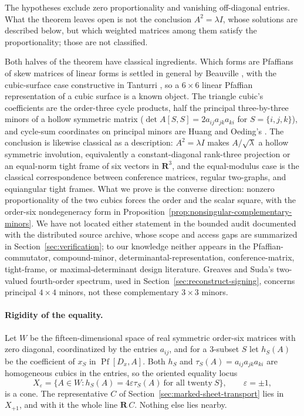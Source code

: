 The hypotheses exclude zero proportionality and vanishing off-diagonal entries.
What the theorem leaves open is not the conclusion \(A^2=\lambda I\), whose
solutions are described below, but which weighted matrices among them satisfy
the proportionality; those are not classified.

Both halves of the theorem have classical ingredients.  Which forms are
Pfaffians of skew matrices of linear forms is settled in general by Beauville
\cite{BeauvilleDeterminantal}, with the cubic-surface case constructive in
Tanturri \cite{TanturriPfaffian}, so a \(6\times6\) linear Pfaffian
representation of a cubic surface is a known object.  The triangle cubic's
coefficients are the order-three cycle products, half the principal
three-by-three minors of a hollow symmetric matrix
(\(\det A[S,S]=2a_{ij}a_{jk}a_{ki}\) for \(S=\{i,j,k\}\)), and cycle-sum
coordinates on principal minors are Huang and Oeding's \cite{HuangOeding}.
The conclusion is likewise classical as a description: \(A^2=\lambda I\)
makes \(A/\sqrt\lambda\) a hollow symmetric involution, equivalently a
constant-diagonal rank-three projection or an equal-norm tight frame of six
vectors in \(\mathbf R^3\), and the equal-modulus case is the classical
correspondence between conference matrices, regular two-graphs, and
equiangular tight frames.  What we prove is the converse direction: nonzero
proportionality of the two cubics forces the order and the scalar square,
with the order-six nondegeneracy form in
Proposition~\ref{prop:nonsingular-complementary-minors}.  We have not located
either statement in the bounded audit documented with the distributed source
archive, whose scope and access gaps are summarized in
Section~\ref{sec:verification}; to our knowledge neither appears in the
Pfaffian-commutator, compound-minor, determinantal-representation,
conference-matrix, tight-frame, or maximal-determinant design literature.
Greaves and Suda's two-valued fourth-order spectrum, used in
Section~\ref{sec:reconstruct-signing}, concerns principal \(4\times4\)
minors, not these complementary \(3\times3\) minors.

\paragraph{Rigidity of the equality.}
Let \(W\) be the fifteen-dimensional space of real symmetric order-six matrices
with zero diagonal, coordinatized by the entries \(a_{ij}\), and for a
\(3\)-subset \(S\) let \(h_S(A)\) be the coefficient of \(x_S\) in
\(\operatorname{Pf}[D_x,A]\).  Both \(h_S\) and
\(\tau_S(A)=a_{ij}a_{jk}a_{ki}\) are homogeneous cubics in the entries, so the
oriented equality locus
\[
 X_\varepsilon=\{A\in W:h_S(A)=4\varepsilon\tau_S(A)\ \text{for all twenty}\ S\},
 \qquad\varepsilon=\pm1,
\]
is a cone.  The representative \(C\) of Section~\ref{sec:marked-sheet-transport}
lies in \(X_{+1}\), and with it the whole line \(\mathbf R\,C\).  Nothing else
lies nearby.

